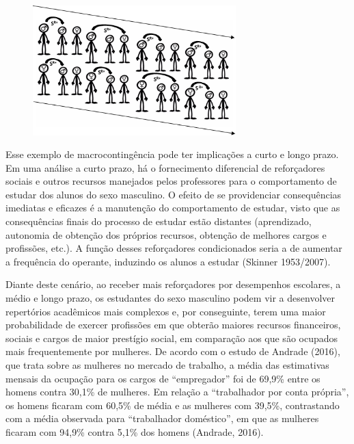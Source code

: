\begin{figure}[h]
    \begin{center}
        \includegraphics[width=0.7\textwidth]{7/figura1}
        \label{figura1}
\end{center}
\end{figure}

Esse exemplo de macrocontingência pode ter implicações a curto e longo prazo. Em uma análise a curto prazo, há o fornecimento diferencial de reforçadores sociais e outros recursos manejados pelos professores para o comportamento de estudar dos alunos do sexo masculino. O efeito de se providenciar consequências imediatas e eficazes é a manutenção do comportamento de estudar, visto que as consequências finais do processo de estudar estão distantes (aprendizado, autonomia de obtenção dos próprios recursos, obtenção de melhores cargos e profissões, etc.). A função desses reforçadores condicionados seria a de aumentar a frequência do operante, induzindo os alunos a estudar (Skinner 1953/2007).

Diante deste cenário, ao receber mais reforçadores por desempenhos escolares, a médio e longo prazo, os estudantes do sexo masculino podem vir a desenvolver repertórios acadêmicos mais complexos e, por conseguinte, terem uma maior probabilidade de exercer profissões em que obterão maiores recursos financeiros, sociais e cargos de maior prestígio social, em comparação aos que são ocupados mais frequentemente por mulheres. De acordo com o estudo de Andrade (2016), que trata sobre as mulheres no mercado de trabalho, a média das estimativas mensais da ocupação para os cargos de “empregador” foi de 69,9\% entre os homens contra 30,1\% de mulheres. Em relação a “trabalhador por conta própria”, os homens ficaram com 60,5\% de média e as mulheres com 39,5\%, contrastando com a média observada para “trabalhador doméstico”, em que as mulheres ficaram com 94,9\% contra 5,1\% dos homens (Andrade, 2016).

